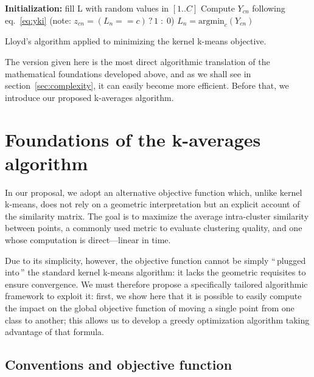 \documentclass[natbib,smallextended]{svjour3}
\newcommand{\cad}{---} %
\newcommand{\gl}[1]{``\,#1\,''} %
\begin{document}
\begin{algorithm}
	\label{algo:kkmeans}
	\SetAlgoLined
	\BlankLine
	\textbf{Initialization:} fill L with random values in $[1..C]$\;
	\BlankLine
	 {
		 {
			 {
				Compute $Y_{cn}$ following eq.~\ref{eq:yki} \label{algline:kkmeans_cplx1}
				(note: $z_{cn} = (L_n == c)\,?\,1\;:\;0$)
			}
			$L_n = \textrm{argmin}_c (Y_{cn})$\;
		}
	}
	\BlankLine
	\caption{Lloyd's algorithm applied to minimizing the kernel k-means objective.}
\end{algorithm}

The version given here is the most direct algorithmic translation of the mathematical foundations developed above, and as we shall see in section~\ref{sec:complexity}, it can easily become more efficient. Before that, we introduce our proposed k-averages algorithm.


\section{Foundations of the k-averages algorithm} \label{sec:kaverages}

In our proposal, we adopt an alternative objective function which, unlike kernel k-means, does not rely on a geometric interpretation but an explicit account of the similarity matrix. The goal is to maximize the average intra-cluster similarity between points, a commonly used metric to evaluate clustering quality, and one whose computation is direct\cad{}linear in time.

Due to its simplicity, however, the objective function cannot be simply \gl{plugged into} the standard kernel k-means algorithm: it lacks the geometric requisites to ensure convergence. We must therefore propose a specifically tailored algorithmic framework to exploit it: first, we show here that it is possible to easily compute the impact on the global objective function of moving a single point from one class to another; this allows us to develop a greedy optimization algorithm taking advantage of that formula.

\subsection{Conventions and objective function}
\end{document}
